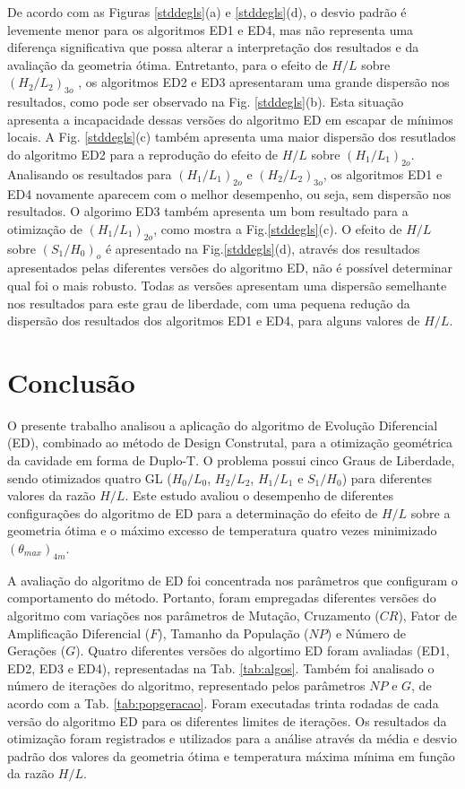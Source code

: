 \documentclass[12pt,A4,A4pt]{article}
\begin{document}
 De acordo com as Figuras \ref{stddegls}(a) e \ref{stddegls}(d), o desvio padrão é levemente menor para os algoritmos ED1 e ED4, mas não representa uma diferença significativa que possa alterar a interpretação dos resultados e da avaliação da geometria ótima. Entretanto, para o efeito de $H/L$ sobre ${(H_{2}/L_{2})_{3o}}$	, os algoritmos ED2 e ED3 apresentaram uma grande dispersão nos resultados, como pode ser observado na Fig. \ref{stddegls}(b). Esta situação apresenta a incapacidade dessas versões do algoritmo ED em escapar de mínimos locais.  A Fig. \ref{stddegls}(c) também apresenta uma maior dispersão dos resutlados do algoritmo ED2 para a reprodução do efeito de $H/L$ sobre ${(H_{1}/L_{1})_{2o}}$. Analisando os resultados para  ${(H_{1}/L_{1})_{2o}}$ e ${(H_{2}/L_{2})_{3o}}$, os algoritmos ED1 e ED4 novamente aparecem com o melhor desempenho, ou seja, sem dispersão nos resultados. O algorimo ED3 também apresenta um bom resultado para a otimização de ${(H_{1}/L_{1})_{2o}}$, como mostra a Fig.\ref{stddegls}(c). O efeito de $H/L$ sobre ${(S_{1}/H_{0})_{o}}$ é apresentado na Fig.\ref{stddegls}(d), através dos resultados apresentados pelas diferentes versões do algoritmo ED, não é possível determinar qual foi o mais robusto. Todas as versões apresentam uma dispersão semelhante nos resultados para este grau de liberdade, com uma pequena redução da dispersão dos resultados dos algoritmos ED1 e ED4, para alguns valores de $H/L$.


\section{Conclusão}
\label{opt}
\hspace{0.5cm} O presente trabalho analisou a aplicação do algoritmo de Evolução Diferencial (ED), combinado ao método de Design Construtal, para a otimização geométrica da cavidade em forma de Duplo-T. O problema possui cinco Graus de Liberdade, sendo otimizados quatro GL ($H_{0}/L_{0}$,  $H_{2}/L_{2}$, $H_{1}/L_{1}$ e $S_{1}/H_{0}$) para diferentes valores da razão $H/L$. Este estudo avaliou o desempenho de diferentes configurações do algoritmo de ED para a determinação do efeito de $H/L$ sobre a geometria ótima e o máximo excesso de temperatura quatro vezes minimizado  $({\theta}_{max})_{4m}$.

A avaliação do algoritmo de ED foi concentrada nos parâmetros que configuram o comportamento do método. Portanto, foram empregadas diferentes versões do algoritmo com variações nos parâmetros de Mutação, Cruzamento ($CR$), Fator de Amplificação Diferencial ($F$), Tamanho da População ($NP$) e Número de Gerações ($G$). Quatro diferentes versões do algortimo ED foram avaliadas (ED1, ED2, ED3 e ED4), representadas na Tab. \ref{tab:algos}. Também foi analisado o número de iterações do algoritmo, representado pelos parâmetros $NP$ e $G$, de acordo com a Tab. \ref{tab:popgeracao}. Foram executadas trinta rodadas de cada versão do algoritmo ED para os diferentes limites de iterações. Os resultados da otimização foram registrados e utilizados para a análise através da média e desvio padrão dos valores da geometria ótima e temperatura máxima mínima em função da razão $H/L$.
\end{document}
